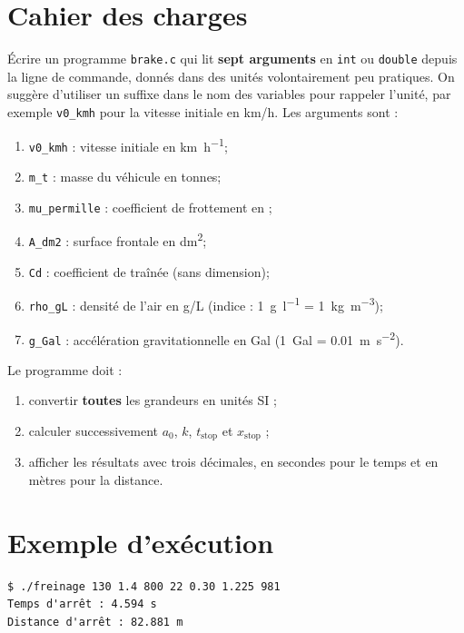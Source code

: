 \documentclass[french,a4paper,addpoints,11pt]{exam}
\begin{document}
\begin{multicols}{2}
\begin{questions}
        \section*{Cahier des charges}

        Écrire un programme \texttt{brake.c} qui lit \textbf{sept arguments} en \texttt{int} ou \texttt{double} depuis la ligne de commande, donnés dans des unités volontairement peu pratiques. On suggère d'utiliser un suffixe dans le nom des variables pour rappeler l'unité, par exemple \texttt{v0\_kmh} pour la vitesse initiale en km/h. Les arguments sont :

        \begin{enumerate}
            \item \texttt{v0\_kmh} : vitesse initiale en \si{\kilo\metre\per\hour};
            \item \texttt{m\_t} : masse du véhicule en tonnes;
            \item \texttt{mu\_permille} : coefficient de frottement en \si{\perthousand};
            \item \texttt{A\_dm2} : surface frontale en \si{\deci\metre\squared};
            \item \texttt{Cd} : coefficient de traînée (sans dimension);
            \item \texttt{rho\_gL} : densité de l'air en g/L (indice : \SI{1}{\gram\per\litre} = \SI{1}{\kilogram\per\metre\cubed});
            \item \texttt{g\_Gal} : accélération gravitationnelle en Gal (\SI{1}{Gal} = \SI{0.01}{\metre\per\second\squared}).
        \end{enumerate}

        Le programme doit :
        \begin{enumerate}
            \item convertir \textbf{toutes} les grandeurs en unités SI ;
            \item calculer successivement $a_0$, $k$, $t_{\text{stop}}$ et $x_{\text{stop}}$ ;
            \item afficher les résultats avec trois décimales, en secondes pour le temps et en mètres pour la distance.
        \end{enumerate}

        \section*{Exemple d'exécution}

        \begin{lstlisting}
$ ./freinage 130 1.4 800 22 0.30 1.225 981
Temps d'arrêt : 4.594 s
Distance d'arrêt : 82.881 m
        \end{lstlisting}


\end{questions}
\end{multicols}
\end{document}

